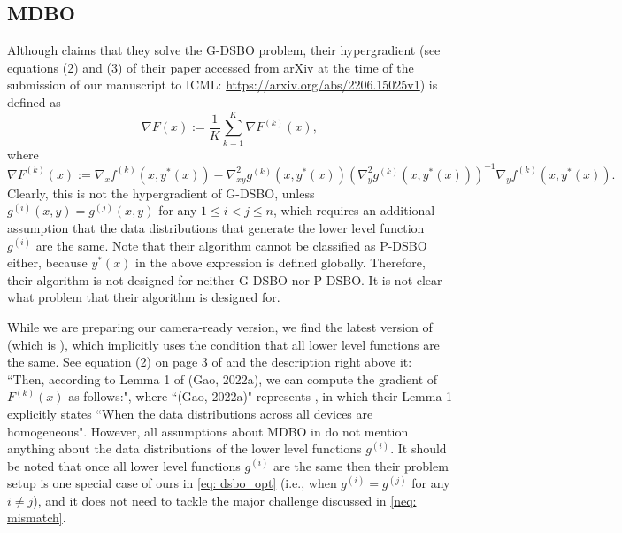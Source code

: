 \documentclass{article}
\theoremstyle{plain}
\theoremstyle{definition}
\theoremstyle{remark}
\begin{document}
\subsection{MDBO}\label{sec: MDBO_discussion}
Although \citet{gao2022stochastic} claims that they solve the G-DSBO problem, their hypergradient (see equations (2) and (3) of their paper accessed from arXiv at the time of the submission of our manuscript to ICML: \url{https://arxiv.org/abs/2206.15025v1})
is defined as
\[
    \nabla F(x) := \frac{1}{K}\sum_{k=1}^{K}\nabla F^{(k)}(x),
\]
where 
\[
    \nabla F^{(k)}(x) := \nabla_x f^{(k)}(x, y^*(x)) - \nabla_{xy}^2g^{(k)}(x, y^*(x))(\nabla_y^2 g^{(k)}(x,y^*(x)))^{-1}\nabla_y f^{(k)}(x,y^*(x)).
\]
Clearly, this is not the hypergradient of G-DSBO, unless $g^{(i)}(x,y)=g^{(j)}(x,y)$ for any $1\leq i<j \leq n$, which requires an additional assumption that the data distributions that generate the lower level function $g^{(i)}$ are the same.
Note that their algorithm cannot be classified as P-DSBO either, because $y^*(x)$ in the above expression is defined globally. Therefore, their algorithm is not designed for neither G-DSBO nor P-DSBO. It is not clear what problem that their algorithm is designed for. 

While we are preparing our camera-ready version, we find the latest version of \citet{gao2022stochastic} (which is \citet{gao2023convergence}), which implicitly uses the condition that all lower level functions are the same. See equation (2) on page 3 of \cite{gao2023convergence} and the description right above it: ``Then, according to Lemma 1 of (Gao, 2022a), we can compute the gradient of $F^{(k)}(x)$ as follows:", where ``(Gao, 2022a)" represents \citet{gao2022convergence_fed}, in which their Lemma 1 explicitly states ``When the data distributions across all devices are homogeneous". However, all assumptions about MDBO in \citet{gao2022stochastic} do not mention anything about the data distributions of the lower level functions $g^{(i)}$. It should be noted that once all lower level functions $g^{(i)}$ are the same then their problem setup is one special case of ours in \eqref{eq: dsbo_opt} (i.e., when $g^{(i)} = g^{(j)}$ for any $i\neq j$), and it does not need to tackle the major challenge discussed in \eqref{neq: mismatch}.
\end{document}
